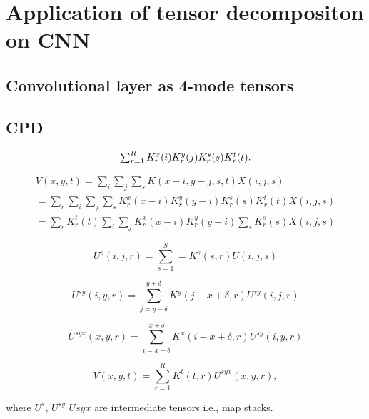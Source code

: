 \section{Application of tensor decompositon on CNN}
\label{sec:cpd-application}
\subsection{Convolutional layer as 4-mode tensors}

\subsection{CPD}

\begin{equation}
$$ \sum_{r=1}^R K^x_r(i)K^y_r(j)K^s_r(s)K^t_r(t) $$.	
\end{equation}


\begin{center}
\begin{align*}
	V(x, y, t) = \sum_i \sum_j \sum_s K(x-i, y-j, s, t)X(i, j, s) \\
		= \sum_r \sum_i \sum_j \sum_s K^x_r(x-i)K^y_r(y-i)K^s_r(s)K^t_r(t)X(i, j, s)\\
			= \sum_r K^t_r(t) \sum_i \sum_j K^x_r(x-i)K^y_r(y-i) \sum_s K^s_r(s) X(i, j, s) \tag{4}
\end{align*}
\end{center}

\begin{equation}
\label{eq:cpd1}
    U^s(i,j,r) =\sum^{S}_{s=1}=K^s(s,r)U(i,j,s)    
\end{equation}

\begin{equation}
    U^{sy}(i,y,r) = \sum_{j=y-\delta}^{y+\delta} K^y (j-x + \delta,r)U^{sy}(i,j,r)
\end{equation}

\begin{equation}
    U^{syx}(x,y,r) = \sum_{i=x-\delta}^{x+\delta} K^x (i-x + \delta,r)U^{sy}(i,y,r)
\end{equation}

\begin{equation}
\label{eq:cpd2}
    V(x,y,t) = \sum_{r=1}^R K^t (t,r) U^{syx}(x,y,r),
\end{equation}

where $U^s$, $U^{sy}$ $U{syx}$ are intermediate tensors i.e., map stacks. 

